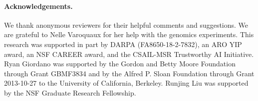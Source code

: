 \paragraph{Acknowledgements.} We thank anonymous reviewers for their helpful
comments and suggestions. We are grateful to Nelle Varoquaux for her help
with the genomics experiments. This research was supported in part by DARPA (FA8650-18-2-7832), an ARO
YIP award, an NSF CAREER award, and the CSAIL-MSR Trustworthy AI Initiative. Ryan Giordano was
supported by the Gordon and Betty Moore Foundation through Grant GBMF3834 and by
the Alfred P. Sloan Foundation through Grant 2013-10-27 to the University of
California, Berkeley. Runjing Liu was supported by the NSF Graduate Research
Fellowship.
